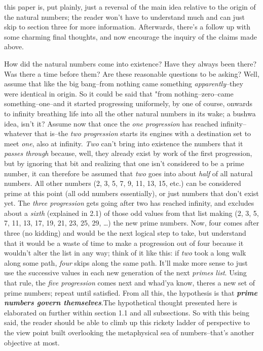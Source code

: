 \documentclass[12pt, letterpaper, twosided]{report}
\begin{document}
this paper is, put plainly, just a reversal of the main idea relative to the origin of the natural numbers; the reader won't have to understand much and can just skip to section three for more information. Afterwards, there's a follow up with some charming final thoughts, and now encourage the inquiry of the claims made above.

\abstract%
\hspace{0.5cm}How did the natural numbers come into existence? Have they always been there? Was there a time before them? Are these reasonable questions to be asking? Well, assume that like the big bang--from nothing came something \textit{apparently}--they were identical in origin.  So it could be said that "from nothing--zero--came something--one--and it started progressing uniformely, by one of course, onwards to infinity breathing life into all the other natural numbers in its wake; a bushwa idea, isn't it? Assume now that once the \textit{one progression} has reached infinity--whatever that is--the \textit{two progression} starts its engines with a destination set to meet \textit{one}, also at infinity. \textit{Two} can't bring into existence the numbers that it \textit{passes through} because, well,  they already exist by work of the first progression, but by ignoring that bit and realizing that one isn't considered to be a prime number, it can therefore be assumed that \textit{two} goes into about \textit{half} of all natural numbers. All other numbers (2, 3, 5, 7, 9, 11, 13, 15, etc.) can be considered prime at this point (all odd numbers essentially), or just numbers that don't exist yet. The \textit{three progression} gets going after two has reached infinity, and excludes about a \textit{sixth} (explained in 2.1) of those odd values from that list making (2, 3, 5, 7, 11, 13, 17, 19, 21, 23, 25, 29, \dots) the new prime numbers. Now, four comes after three (no kidding) and would be the next logical step to take, but understand that it would be a waste of time to make a progression out of four because it wouldn't alter the list in any way; think of it like this: if \textit{two} took a long walk along some path, \textit{four} skips along the same path. It'll make more sense to just use the successive values in each new generation of the next \textit{primes list}. Using that rule, the \textit{five progression} comes next and whad'ya know, theres a new set of prime numbers; repeat until satisfied. From all this, the hypothesis is that \textbf{\textit{prime numbers govern themselves}}.\newline The hypothetical thought presented here is elaborated on further within section 1.1 and all subsections. So with this being said, the reader should be able to climb up this rickety ladder of perspective to the view point built overlooking the metaphysical sea of numbers--that's another objective at most.
 
\end{document}
